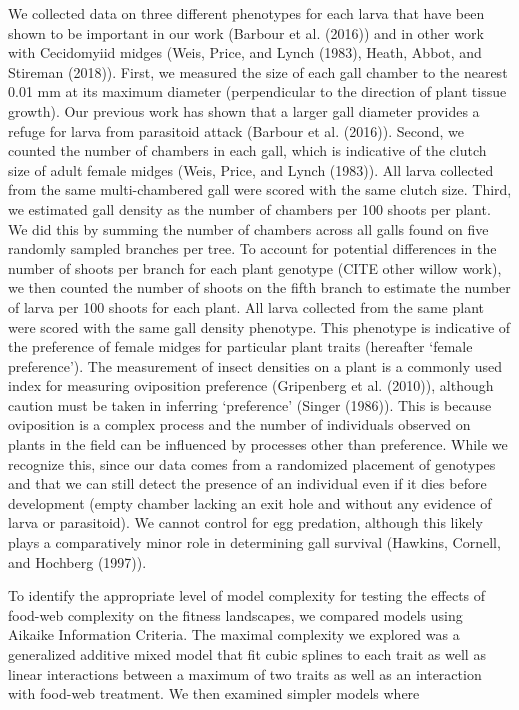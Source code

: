 \documentclass[]{elsarticle} %
\begin{document}
We collected data on three different phenotypes for each larva that have
been shown to be important in our work (Barbour et al. (2016)) and in
other work with Cecidomyiid midges (Weis, Price, and Lynch (1983),
Heath, Abbot, and Stireman (2018)). First, we measured the size of each
gall chamber to the nearest 0.01 mm at its maximum diameter
(perpendicular to the direction of plant tissue growth). Our previous
work has shown that a larger gall diameter provides a refuge for larva
from parasitoid attack (Barbour et al. (2016)). Second, we counted the
number of chambers in each gall, which is indicative of the clutch size
of adult female midges (Weis, Price, and Lynch (1983)). All larva
collected from the same multi-chambered gall were scored with the same
clutch size. Third, we estimated gall density as the number of chambers
per 100 shoots per plant. We did this by summing the number of chambers
across all galls found on five randomly sampled branches per tree. To
account for potential differences in the number of shoots per branch for
each plant genotype (CITE other willow work), we then counted the number
of shoots on the fifth branch to estimate the number of larva per 100
shoots for each plant. All larva collected from the same plant were
scored with the same gall density phenotype. This phenotype is
indicative of the preference of female midges for particular plant
traits (hereafter `female preference'). The measurement of insect
densities on a plant is a commonly used index for measuring oviposition
preference (Gripenberg et al. (2010)), although caution must be taken in
inferring `preference' (Singer (1986)). This is because oviposition is a
complex process and the number of individuals observed on plants in the
field can be influenced by processes other than preference. While we
recognize this, since our data comes from a randomized placement of
genotypes and that we can still detect the presence of an individual
even if it dies before development (empty chamber lacking an exit hole
and without any evidence of larva or parasitoid). We cannot control for
egg predation, although this likely plays a comparatively minor role in
determining gall survival (Hawkins, Cornell, and Hochberg (1997)).

To identify the appropriate level of model complexity for testing the
effects of food-web complexity on the fitness landscapes, we compared
models using Aikaike Information Criteria. The maximal complexity we
explored was a generalized additive mixed model that fit cubic splines
to each trait as well as linear interactions between a maximum of two
traits as well as an interaction with food-web treatment. We then
examined simpler models where
\end{document}
